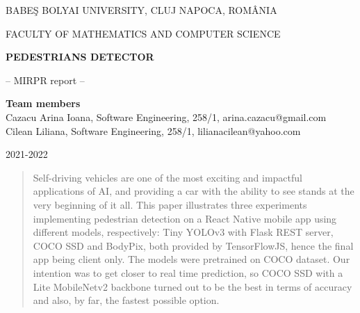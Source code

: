 \documentclass[runningheads,a4paper,11pt]{report}
\begin{document}
\begin{titlepage}
\sloppy

\begin{center}
BABE\c S BOLYAI UNIVERSITY, CLUJ NAPOCA, ROM\^ ANIA

FACULTY OF MATHEMATICS AND COMPUTER SCIENCE

\vspace{6cm}

\Huge \textbf{PEDESTRIANS DETECTOR}

\vspace{1cm}

\normalsize -- MIRPR report --

\end{center}


\vspace{5cm}

\begin{flushright}
\Large{\textbf{Team members}}\\
Cazacu Arina Ioana, Software Engineering, 258/1, arina.cazacu@gmail.com\\
Cilean Liliana, Software Engineering, 258/1, lilianacilean@yahoo.com\\
\end{flushright}

\vspace{4cm}

\begin{center}
2021-2022
\end{center}

\end{titlepage}


\begin{abstract}
Self-driving vehicles are one of the most exciting and impactful applications of AI, and providing a car with the ability to see stands at the very beginning of it all. This paper illustrates three experiments implementing pedestrian detection on a React Native mobile app using different models, respectively: Tiny YOLOv3 with Flask REST server, COCO SSD and BodyPix, both provided by TensorFlowJS, hence the final app being client only. The models were pretrained on COCO dataset. Our intention was to get closer to real time prediction, so COCO SSD with a Lite MobileNetv2 backbone turned out to be the best in terms of accuracy and also, by far, the fastest possible option.
\end{abstract}


\tableofcontents
\end{document}
